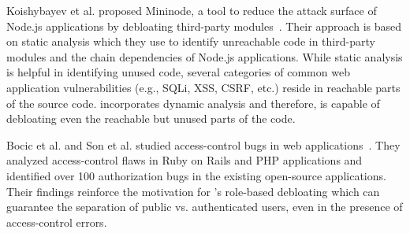 Koishybayev et al. proposed Mininode, a tool to reduce the attack surface of Node.js applications by debloating third-party modules~\cite{mininode}. 
Their approach is based on static analysis which they use to identify unreachable code in third-party modules and the chain dependencies of Node.js applications. 
While static analysis is helpful in identifying unused code, several categories of common web application vulnerabilities (e.g., SQLi, XSS, CSRF, etc.) reside in reachable parts of the source code. 
\dbltr{} incorporates dynamic analysis and therefore, is capable of debloating even the reachable but unused parts of the code. 

Bocic et al. and Son et al. studied access-control bugs in web applications~\cite{7582754, son2013fix}. 
They analyzed access-control flaws in Ruby on Rails and PHP applications and identified over 100 authorization bugs in the existing open-source applications. Their findings reinforce the motivation for \dbltr{}'s role-based debloating which can guarantee the separation of public vs. authenticated users, even in the presence of access-control errors.